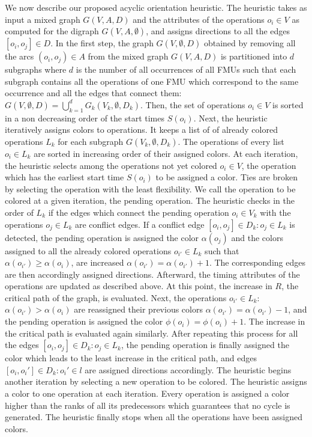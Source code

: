We now describe our proposed acyclic orientation heuristic. The heuristic takes as input a mixed graph $G(V,A,D)$ and the attributes of the operations $o_i \in V$ as computed for the digraph $G(V,A,\emptyset)$, and assigns directions to all the edges $[o_i,o_j] \in D$. In the first step, the graph $G(V,\emptyset,D)$ obtained by removing all the arcs $(o_i,o_j) \in A$ from the mixed graph $G(V,A,D)$ is partitioned into $d$ subgraphs where $d$ is the number of all occurrences of all FMUs such that each subgraph contains all the operations of one FMU which correspond to the same occurrence and all the edges that connect them: $ G(V,\emptyset,D)= \bigcup_{k=1}^d G_k(V_k,\emptyset,D_k)$. Then, the set of operations $o_i \in V$ is sorted in a non decreasing order of the start times $S(o_i)$. Next, the heuristic iteratively assigns colors to operations. It keeps a list of of already colored operations $L_k$ for each subgraph $G(V_k,\emptyset,D_k)$. The operations of every list $o_i \in L_k$ are sorted in increasing order of their assigned colors. At each iteration, the heuristic selects among the operations not yet colored $o_i \in V$, the operation which has the earliest start time $S(o_i)$ to be assigned a color. Ties are broken by selecting the operation with the least flexibility. We call the operation to be colored at a given iteration, the pending operation. The heuristic checks in the order of $L_k$ if the edges which connect the pending operation $o_i \in V_k$ with the operations $o_j \in L_k$ are conflict edges. If a conflict edge $[o_i,o_j] \in D_k: o_j \in L_k$ is detected, the pending operation is assigned the color $\alpha(o_j)$ and the colors assigned to all the already colored operations $o_{i'} \in L_k$ such that $\alpha(o_{i'}) \geq \alpha(o_{i})$, are increased $\alpha(o_{i'}) = \alpha(o_{i'})+1$. The corresponding edges are then accordingly assigned directions. Afterward, the timing attributes of the operations are updated as described above. At this point, the increase in $R$, the critical path of the graph, is evaluated. Next, the operations $o_{i'} \in L_k$: $\alpha(o_{i'}) > \alpha(o_{i})$ are reassigned their previous colors $\alpha(o_{i'}) = \alpha(o_{i'})-1$, and the pending operation is assigned the color $\phi(o_i)=\phi(o_i)+1$. The increase in the critical path is evaluated again similarly. After repeating this process for all the edges $[o_i,o_j] \in D_k: o_j \in L_k$, the pending operation is finally assigned the color which leads to the least increase in the critical path, and edges $[o_i,o_i'] \in D_k : o_i' \in l$ are assigned directions accordingly. The heuristic begins another iteration by selecting a new operation to be colored. The heuristic assigns a color to one operation at each iteration. Every operation is assigned a color higher than the ranks of all its predecessors which guarantees that no cycle is generated. The heuristic finally stops when all the operations have been assigned colors. 
